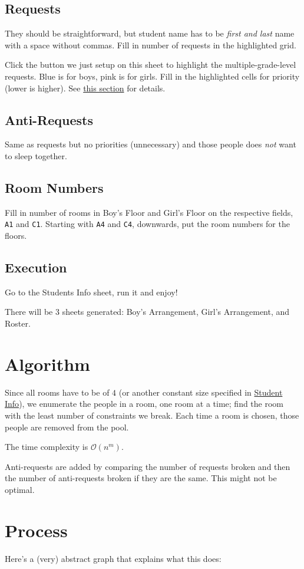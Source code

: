 \documentclass[openany,notitlepage]{book}
\begin{document}
	\subsection{Requests}
	They should be straightforward, but student name has to be \emph{first and last} name with a space without commas. Fill
	in number of requests in the highlighted grid.
	
	Click the button we just setup on this sheet to highlight the multiple-grade-level requests. Blue is for boys, pink is for
	girls. Fill in the highlighted cells for priority (lower is higher). See \hyperref[intergrade]{this section} for details.
	\subsection{Anti-Requests}\label{anti}
	Same as requests but no priorities (unnecessary) and those people does \emph{not} want to sleep together.
	\subsection{Room Numbers}
	Fill in number of rooms in Boy's Floor and Girl's Floor on the respective fields, \verb|A1| and \verb|C1|. Starting with
	\verb|A4| and \verb|C4|, downwards, put the room numbers for the floors.
	\subsection{Execution}
	Go to the Students Info sheet, run it and enjoy!
	
	There will be $3$ sheets generated: Boy's Arrangement, Girl's Arrangement, and Roster.
	\section{Algorithm}\label{Algorithm}
	Since all rooms have to be of $4$ (or another constant size specified in \hyperref[inf]{Student Info}), we enumerate the people in a room, one room at a time;
	find the room with the least number of constraints we break. Each time a room is chosen, those people are removed
	from the pool.
	
	The time complexity is $\mathcal{O}(n^m)$.
	
	Anti-requests are added by comparing the number of requests broken and then the number of anti-requests broken
	if they are the same. This might not be optimal. 
	\section{Process}
	Here's a (very) abstract graph that explains what this does:
	
\end{document}
